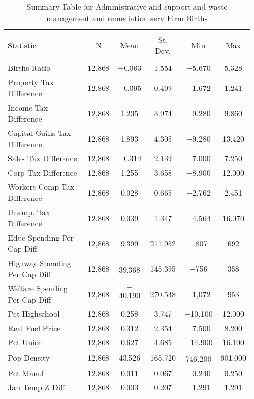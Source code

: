 
\begin{table}[!htbp] \centering 
  \caption{Summary Table for  Administrative and support and waste management and remediation serv Firm Births} 
  \label{56summary} 
\begin{tabular}{@{\extracolsep{5pt}}lccccc} 
\\[-1.8ex]\hline 
\hline \\[-1.8ex] 
Statistic & \multicolumn{1}{c}{N} & \multicolumn{1}{c}{Mean} & \multicolumn{1}{c}{St. Dev.} & \multicolumn{1}{c}{Min} & \multicolumn{1}{c}{Max} \\ 
\hline \\[-1.8ex] 
Births Ratio & 12,868 & $-$0.063 & 1.554 & $-$5.670 & 5.328 \\ 
Property Tax Difference & 12,868 & $-$0.095 & 0.499 & $-$1.672 & 1.241 \\ 
Income Tax Difference & 12,868 & 1.205 & 3.974 & $-$9.280 & 9.860 \\ 
Capital Gains Tax Difference & 12,868 & 1.893 & 4.305 & $-$9.280 & 13.420 \\ 
Sales Tax Difference & 12,868 & $-$0.314 & 2.139 & $-$7.000 & 7.250 \\ 
Corp Tax Difference & 12,868 & 1.255 & 3.658 & $-$8.900 & 12.000 \\ 
Workers Comp Tax Difference & 12,868 & 0.028 & 0.665 & $-$2.762 & 2.451 \\ 
Unemp. Tax Difference & 12,868 & 0.039 & 1.347 & $-$4.564 & 16.070 \\ 
Educ Spending Per Cap Diff & 12,868 & 9.399 & 211.962 & $-$807 & 692 \\ 
Highway Spending Per Cap Diff & 12,868 & $-$39.368 & 145.395 & $-$756 & 358 \\ 
Welfare Spending Per Cap Diff & 12,868 & $-$40.190 & 270.538 & $-$1,072 & 953 \\ 
Pct Highschool & 12,868 & 0.258 & 3.747 & $-$10.100 & 12.000 \\ 
Real Fuel Price & 12,868 & 0.312 & 2.354 & $-$7.500 & 8.200 \\ 
Pct Union & 12,868 & 0.627 & 4.685 & $-$14.900 & 16.100 \\ 
Pop Density & 12,868 & 43.526 & 165.720 & $-$746.200 & 901.000 \\ 
Pct Manuf & 12,868 & 0.011 & 0.067 & $-$0.240 & 0.250 \\ 
Jan Temp Z Diff & 12,868 & 0.003 & 0.207 & $-$1.291 & 1.291 \\ 

\end{tabular}
\end{table}
